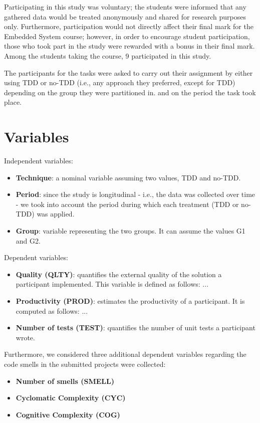 Participating in this study was voluntary; the students were informed that any gathered data would be treated anonymously and shared for research purposes only. Furthermore, participation would not directly affect their final mark for the Embedded System course; however, in order to encourage student participation, those who took part in the study were rewarded with a bonus in their final mark. Among the students taking the course, 9 participated in this study.

The participants for the tasks were asked to carry out their assignment by either using TDD or no-TDD (i.e., any approach they preferred, except for TDD) depending on the group they were partitioned in. and on the period the task took place.


\section{Variables}
Independent variables:
\begin{itemize}
    \item \textbf{Technique}: a nominal variable assuming two values, TDD and no-TDD.
    \item \textbf{Period}: since the study is longitudinal - i.e., the data was collected over time - we took into account the period during which each treatment (TDD or no-TDD) was applied.
    \item \textbf{Group}:  variable representing the two groups. It can assume the values G1 and G2.
\end{itemize}


Dependent variables:
\begin{itemize}
    \item \textbf{Quality (QLTY)}: quantifies the external quality of the solution a participant implemented. This variable is defined as follows: ...
    \item \textbf{Productivity (PROD)}: estimates the productivity of a participant. It is computed as follows: ...
    \item \textbf{Number of tests (TEST)}: quantifies the number of unit tests a participant wrote.
\end{itemize}


Furthermore, we considered three additional dependent variables regarding the code smells in the submitted projects were collected:
\begin{itemize}
    \item \textbf{Number of smells (SMELL)}
    \item \textbf{Cyclomatic Complexity (CYC)}
    \item \textbf{Cognitive Complexity (COG)}
\end{itemize}




